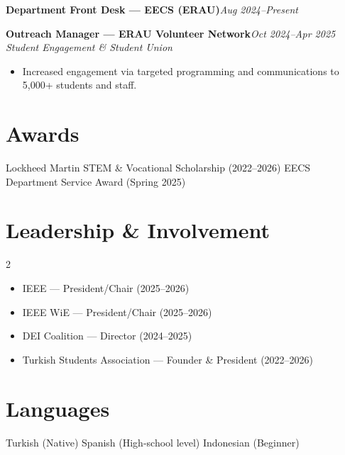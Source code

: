 \documentclass[10pt]{article}
\newcommand{\role}[2]{\textbf{#1}\hfill{\itshape #2}}
\newcommand{\sep}{\;\textbar\;}
\begin{document}
\role{Department Front Desk — EECS (ERAU)}{Aug 2024–Present}

\role{Outreach Manager — ERAU Volunteer Network}{Oct 2024–Apr 2025}\\
\emph{Student Engagement \& Student Union}\\[-5pt]
\begin{itemize}
  \item Increased engagement via targeted programming and communications to 5{,}000+ students and staff.
\end{itemize}

\section*{Awards}
Lockheed Martin STEM \& Vocational Scholarship (2022–2026) \sep EECS Department Service Award (Spring 2025)

\section*{Leadership \& Involvement}
\begin{multicols}{2}
  \begin{itemize}[nosep]
    \item IEEE — President/Chair (2025–2026)
    \item IEEE WiE — President/Chair (2025–2026)
    \item DEI Coalition — Director (2024–2025)
    \item Turkish Students Association — Founder \& President (2022–2026)
  \end{itemize}
\end{multicols}

\section*{Languages}
Turkish (Native) \sep Spanish (High-school level) \sep Indonesian (Beginner)
\end{document}
